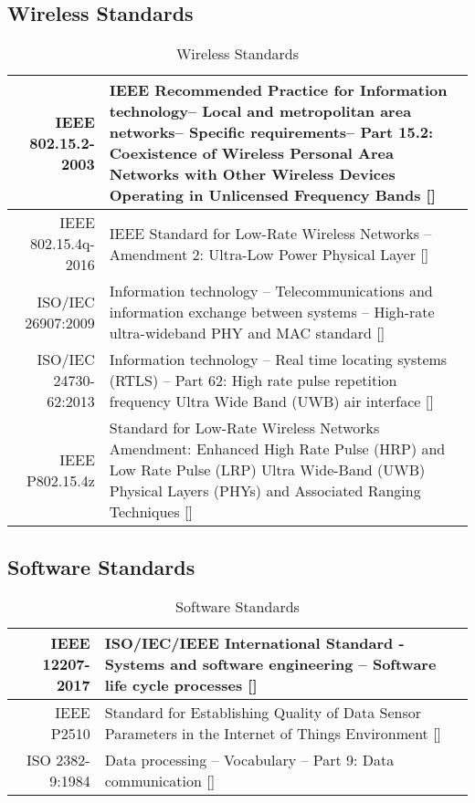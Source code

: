 \subsection{Wireless Standards}
\bgroup
\def\arraystretch{1.5}
\begin{table}[H]
\centering
\begin{tabular}{ | p{3.5cm} | p{11.5cm}| } 
\hline
\multicolumn{1}{|r|}{IEEE 802.15.2-2003} & IEEE Recommended Practice for Information technology-- Local and metropolitan area networks-- Specific requirements-- Part 15.2: Coexistence of Wireless Personal Area Networks with Other Wireless Devices Operating in Unlicensed Frequency Bands []\\ 
\hline
\multicolumn{1}{|r|}{IEEE 802.15.4q-2016} & IEEE Standard for Low-Rate Wireless Networks --Amendment 2: Ultra-Low Power Physical Layer []\\ 
\hline
\multicolumn{1}{|r|}{ISO/IEC 26907:2009} & Information technology -- Telecommunications and information exchange between systems -- High-rate ultra-wideband PHY and MAC standard []\\  
\hline
\multicolumn{1}{|r|}{ISO/IEC 24730-62:2013} & Information technology -- Real time locating systems (RTLS) -- Part 62: High rate pulse repetition frequency Ultra Wide Band (UWB) air interface []\\  
\hline
\multicolumn{1}{|r|}{IEEE P802.15.4z} & Standard for Low-Rate Wireless Networks Amendment: Enhanced High Rate Pulse (HRP) and Low Rate Pulse (LRP) Ultra Wide-Band (UWB) Physical Layers (PHYs) and Associated Ranging Techniques [] \\  
\hline
\end{tabular}
\caption{Wireless Standards}
\end{table}	


\pagebreak
\subsection{Software Standards}
\bgroup
\def\arraystretch{1.5}
\begin{table}[H]
\centering
\begin{tabular}{ | p{4cm} | p{12cm}| } 
\hline
\multicolumn{1}{|r|}{IEEE 12207-2017} & ISO/IEC/IEEE International Standard - Systems and software engineering -- Software life cycle processes []\\
\hline 
\multicolumn{1}{|r|}{IEEE P2510} & Standard for Establishing Quality of Data Sensor Parameters in the Internet of Things Environment []\\ 
\hline
\multicolumn{1}{|r|}{ISO 2382-9:1984} & Data processing -- Vocabulary -- Part 9: Data communication []\\
\hline 
\end{tabular}
\caption{Software Standards}
\end{table}	
\medskip

